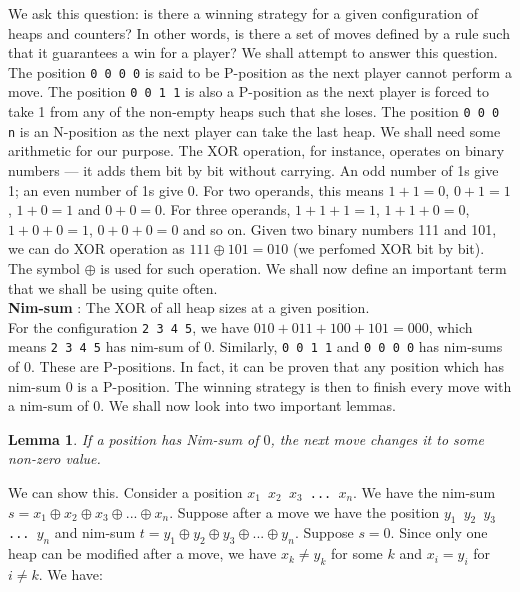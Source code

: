 \documentclass[a4paper, 12pt]{article}
\newcommand{\code}[1]{\colorbox{light-gray}{\texttt{#1}}}
\newtheorem{lemma}[theorem]{Lemma}
\theoremstyle{remark} %
\begin{document}
We ask this question: is there a winning strategy for a given configuration of heaps and counters? In other words, is there a set of moves defined by a rule such that it guarantees a win for a player? We shall attempt to answer this question. The position \code{0 0 0 0} is said to be P-position as the next player cannot perform a move. The position \code{0 0 1 1} is also a P-position as the next player is forced to take 1 from any of the non-empty heaps such that she loses. The position \code{0 0 0 n} is an N-position as the next player can take the last heap. We shall need some arithmetic for our purpose. The XOR operation, for instance, operates on binary numbers --- it adds them bit by bit without carrying. An odd number of 1s give 1; an even number of 1s give 0. For two operands, this means $1+1=0$, $0+1=1$, $1+0=1$ and $0+0=0$. For three operands, $1+1+1 = 1$, $1+1+0=0$, $1+0+0=1$, $0+0+0=0$ and so on. Given two binary numbers 111 and 101, we can do XOR operation as $111\oplus101=010$ (we perfomed XOR bit by bit). The symbol $\oplus$ is used for such operation. We shall now define an important term that we shall be using quite often.\\

\noindent \textbf{Nim-sum} : The XOR of all heap sizes at a given position.\\

For the configuration \code{2 3 4 5}, we have $010+011+100+101=000$, which means \code{2 3 4 5} has nim-sum of $0$. Similarly, \code{0 0 1 1} and \code{0 0 0 0} has nim-sums of $0$. These are P-positions. In fact, it can be proven that any position which has nim-sum $0$ is a P-position. The winning strategy is then to finish every move with a nim-sum of $0$. We shall now look into two important lemmas.

\begin{lemma}
	If a position has Nim-sum of $0$, the next move changes it to some non-zero value.
\end{lemma}

\noindent We can show this. Consider a position \code{$x_1$ $x_2$ $x_3$ ... $x_n$}. We have the nim-sum $s = x_1\oplus x_2\oplus x_3\oplus ... \oplus x_n$. Suppose after a move we have the position \code{$y_1$ $y_2$ $y_3$ ... $y_n$} and nim-sum $t = y_1\oplus y_2\oplus y_3\oplus ... \oplus y_n$. Suppose $s=0$. Since only one heap can be modified after a move, we have $x_k \ne y_k$ for some $k$ and $x_i = y_i$ for $i \ne k$. We have:\\
\end{document}
